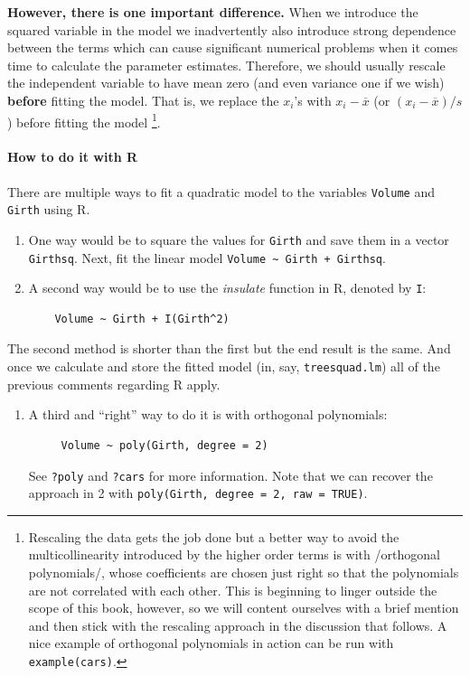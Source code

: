 \documentclass[captions=tableheading]{scrbook}
\begin{document}
\textbf{However, there is one important difference.} When we introduce the squared variable in the model we inadvertently also introduce strong dependence between the terms which can cause significant numerical problems when it comes time to calculate the parameter estimates. Therefore, we should usually rescale the independent variable to have mean zero (and even variance one if we wish) \textbf{before} fitting the model. That is, we replace the \(x_{i}\)'s with \(x_{i}-\overline{x}\) (or \((x_{i}-\overline{x})/s\)) before fitting the model
\footnote{Rescaling the data gets the job done but a better way to avoid the multicollinearity introduced by the higher order terms is with /orthogonal polynomials/, whose coefficients are chosen just right so that the polynomials are not correlated with each other. This is beginning to linger outside the scope of this book, however, so we will content ourselves with a brief mention and then stick with the rescaling approach in the discussion that follows. A nice example of orthogonal polynomials in action can be run with \texttt{example(cars)}.}.

\paragraph*{How to do it with \textsf{R}}

There are multiple ways to fit a quadratic model to the variables \texttt{Volume} and \texttt{Girth} using \textsf{R}.
\begin{enumerate}
\item One way would be to square the values for \texttt{Girth} and save them in a vector \texttt{Girthsq}. Next, fit the linear model \texttt{Volume \textasciitilde{} Girth + Girthsq}.
\item A second way would be to use the \emph{insulate} function in \textsf{R}, denoted by \texttt{I}:
\begin{verbatim}
    Volume ~ Girth + I(Girth^2)
\end{verbatim}
\end{enumerate}
The second method is shorter than the first but the end result is the same. And once we calculate and store the fitted model (in, say, \texttt{treesquad.lm}) all of the previous comments regarding \textsf{R} apply.  
\begin{enumerate}
\item A third and ``right'' way to do it is with orthogonal polynomials:
\begin{verbatim}
     Volume ~ poly(Girth, degree = 2)
\end{verbatim}
   See \texttt{?poly} and \texttt{?cars} for more information. Note that we can recover the approach in 2 with \texttt{poly(Girth, degree = 2, raw = TRUE)}.
\end{enumerate}
\end{document}
